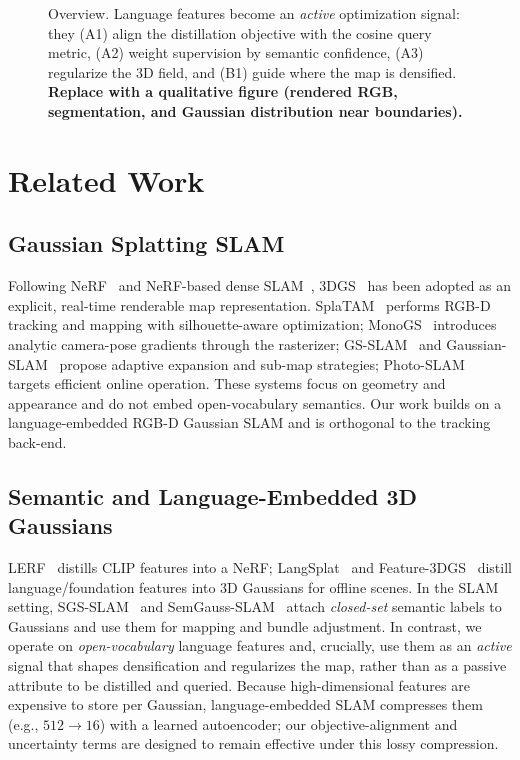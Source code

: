 \documentclass[10pt, journal]{IEEEtran}
\begin{document}
\begin{figure}[t]
  \centering
  \caption{Overview. Language features become an \emph{active} optimization signal:
  they (A1) align the distillation objective with the cosine query metric, (A2)
  weight supervision by semantic confidence, (A3) regularize the 3D field, and
  (B1) guide where the map is densified. \textbf{Replace with a qualitative
  figure (rendered RGB, segmentation, and Gaussian distribution near boundaries).}}
  \label{fig:teaser}
\end{figure}

\section{Related Work}\label{sec:related}

\subsection{Gaussian Splatting SLAM}
Following NeRF~\cite{mildenhall2020nerf} and NeRF-based dense
SLAM~\cite{zhu2022niceslam,wang2023coslam,sandstrom2023pointslam},
3DGS~\cite{kerbl3Dgaussians} has been adopted as an explicit, real-time renderable
map representation. SplaTAM~\cite{keetha2024splatam} performs RGB-D tracking and
mapping with silhouette-aware optimization; MonoGS~\cite{matsuki2024monogs}
introduces analytic camera-pose gradients through the rasterizer;
GS-SLAM~\cite{yan2024gsslam} and Gaussian-SLAM~\cite{yugay2023gaussianslam}
propose adaptive expansion and sub-map strategies;
Photo-SLAM~\cite{huang2024photoslam} targets efficient online operation. These
systems focus on geometry and appearance and do not embed open-vocabulary
semantics. Our work builds on a language-embedded RGB-D Gaussian SLAM and is
orthogonal to the tracking back-end.

\subsection{Semantic and Language-Embedded 3D Gaussians}
LERF~\cite{kerr2023lerf} distills CLIP features into a NeRF;
LangSplat~\cite{qin2024langsplat} and Feature-3DGS~\cite{zhou2024feature3dgs}
distill language/foundation features into 3D Gaussians for offline scenes. In the
SLAM setting, SGS-SLAM~\cite{li2024sgsslam} and SemGauss-SLAM~\cite{zhu2024semgauss}
attach \emph{closed-set} semantic labels to Gaussians and use them for mapping and
bundle adjustment. In contrast, we operate on \emph{open-vocabulary} language
features and, crucially, use them as an \emph{active} signal that shapes
densification and regularizes the map, rather than as a passive attribute to be
distilled and queried. Because high-dimensional features are expensive to store
per Gaussian, language-embedded SLAM compresses them (e.g., $512\!\to\!16$) with a
learned autoencoder; our objective-alignment and uncertainty terms are designed to
remain effective under this lossy compression.
\end{document}
